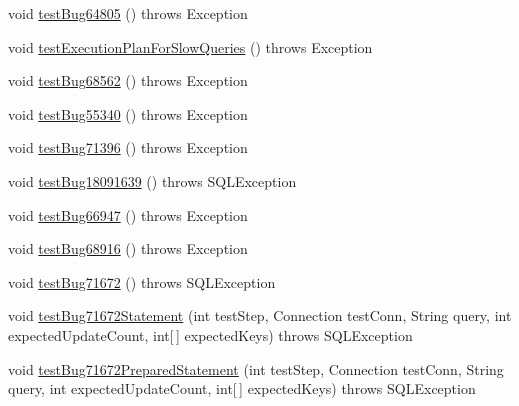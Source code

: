 \begin{DoxyCompactItemize}
\item 
void \mbox{\hyperlink{classtestsuite_1_1regression_1_1_statement_regression_test_af54f8dc05c901b420749b5525d6b1db9}{test\+Bug64805}} ()  throws Exception 
\item 
void \mbox{\hyperlink{classtestsuite_1_1regression_1_1_statement_regression_test_a48e3f759b34396e94ab7bf59872d5604}{test\+Execution\+Plan\+For\+Slow\+Queries}} ()  throws Exception 
\item 
void \mbox{\hyperlink{classtestsuite_1_1regression_1_1_statement_regression_test_a98f77aa1cdaf8554dcfff5b368c4e90a}{test\+Bug68562}} ()  throws Exception 
\item 
void \mbox{\hyperlink{classtestsuite_1_1regression_1_1_statement_regression_test_ad893290c719e6320a980acdd172851e7}{test\+Bug55340}} ()  throws Exception 
\item 
void \mbox{\hyperlink{classtestsuite_1_1regression_1_1_statement_regression_test_a716338573789cf539312a6527ddd2ea6}{test\+Bug71396}} ()  throws Exception 
\item 
void \mbox{\hyperlink{classtestsuite_1_1regression_1_1_statement_regression_test_a01b6dcfb6870df0348d9c1fb80efe81c}{test\+Bug18091639}} ()  throws S\+Q\+L\+Exception 
\item 
void \mbox{\hyperlink{classtestsuite_1_1regression_1_1_statement_regression_test_a222cfacd79b9dcf61c6ebefe3966ede7}{test\+Bug66947}} ()  throws Exception 
\item 
void \mbox{\hyperlink{classtestsuite_1_1regression_1_1_statement_regression_test_a23f5d3d3b8c4eb0019effe8aadd4b4b2}{test\+Bug68916}} ()  throws Exception 
\item 
void \mbox{\hyperlink{classtestsuite_1_1regression_1_1_statement_regression_test_ab1d12cefc8598fc6b119554ddfe01866}{test\+Bug71672}} ()  throws S\+Q\+L\+Exception 
\item 
void \mbox{\hyperlink{classtestsuite_1_1regression_1_1_statement_regression_test_abb13639717a457989454d73d4dbc02b8}{test\+Bug71672\+Statement}} (int test\+Step, Connection test\+Conn, String query, int expected\+Update\+Count, int\mbox{[}$\,$\mbox{]} expected\+Keys)  throws S\+Q\+L\+Exception 
\item 
void \mbox{\hyperlink{classtestsuite_1_1regression_1_1_statement_regression_test_ac89b52220f4a7d1e808940f72f5887c1}{test\+Bug71672\+Prepared\+Statement}} (int test\+Step, Connection test\+Conn, String query, int expected\+Update\+Count, int\mbox{[}$\,$\mbox{]} expected\+Keys)  throws S\+Q\+L\+Exception 
\item 

\end{DoxyCompactItemize}
